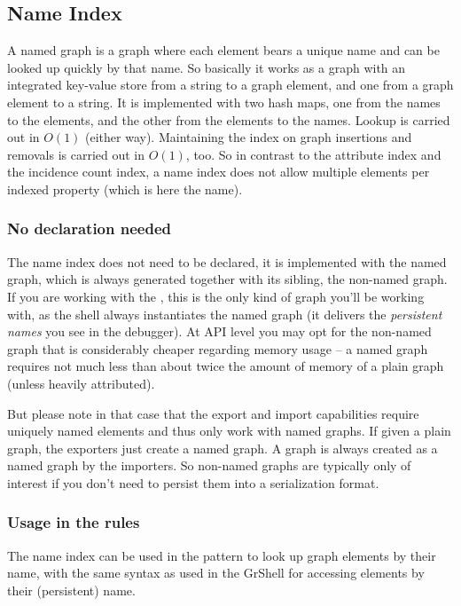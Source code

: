\subsection{Name Index}\label{sec:nameindex}
A named graph is a graph where each element bears a unique name and can be looked up quickly by that name.
So basically it works as a graph with an integrated key-value store from a string to a graph element, and one from a graph element to a string.
It is implemented with two hash maps, one from the names to the elements, and the other from the elements to the names.
Lookup is carried out in $O(1)$ (either way).
Maintaining the index on graph insertions and removals is carried out in $O(1)$, too.
So in contrast to the attribute index and the incidence count index, a name index does not allow multiple elements per indexed property (which is here the name).

\subsubsection*{No declaration needed}
The name index does not need to be declared, it is implemented with the named graph, which is always generated together with its sibling, the non-named graph.
If you are working with the \GrShell, this is the only kind of graph you'll be working with, as the shell always instantiates the named graph (it delivers the \emph{persistent names} you see in the debugger).
At API level you may opt for the non-named graph that is considerably cheaper regarding memory usage -- a named graph requires not much less than about twice the amount of memory of a plain graph (unless heavily attributed).

But please note in that case that the export and import capabilities require uniquely named elements and thus only work with named graphs.
If given a plain graph, the exporters just create a named graph.
A graph is always created as a named graph by the importers.
So non-named graphs are typically only of interest if you don't need to persist them into a serialization format.

\subsubsection*{Usage in the rules}
The name index can be used in the pattern to look up graph elements by their name, with the same syntax as used in the GrShell for accessing elements by their (persistent) name.

